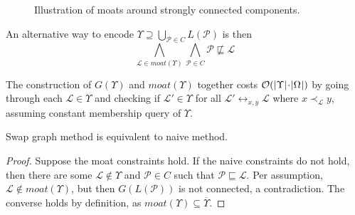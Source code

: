 \documentclass{llncs}
\DeclarePairedDelimiter{\abs}{\lvert}{\rvert}
\newcommand{\poset}[1]{\mathcal{#1}}
\newcommand{\uni}[1][]{\Omega_{#1}}
\newcommand{\lang}[1]{L(#1)}
\newcommand{\swap}[1][]{\leftrightarrow_{#1}}
\newcommand{\sgraph}[1]{G(#1)}
\newcommand{\lext}{\sqsubseteq}
\newcommand{\covered}[1][]{\prec_{#1}}
\newcommand{\complmt}[1]{\overline{#1}}
\newcommand{\bigo}[1]{\mathcal{O}(#1)}
\begin{document}
\begin{figure}[h]
    \centering
    \caption{Illustration of moats around strongly connected components.}
    \label{figure:moat}
\end{figure}

An alternative way to encode $\Upsilon \supseteq \bigcup_{\poset{P} \in C} \lang{\poset{P}}$ is then
\[
\bigwedge_{\poset{L} \in moat(\Upsilon)} \bigwedge_{\poset{P} \in C} \poset{P} \not\lext \poset{L}
\]

The construction of $\sgraph{\Upsilon}$ and $moat(\Upsilon)$ together costs $\bigo{\abs{\Upsilon} \!\cdot\! \abs{\uni}}$ by going through each $\poset{L} \!\in\! \Upsilon$ and checking if $\poset{L}' \!\in\! \Upsilon$ for all $\poset{L}' \swap[x,y] \poset{L}$ where $x \covered[\poset{L}] y$, assuming constant membership query of $\Upsilon$.

\begin{proposition}
    Swap graph method is equivalent to naive method.
\end{proposition}
\begin{proof}
    Suppose the moat constraints hold. If the naive constraints do not hold, then there are some $\poset{L} \!\notin\! \Upsilon$ and $\poset{P} \!\in\! C$ such that $\poset{P} \lext \poset{L}$. Per assumption, $\poset{L} \!\notin\! moat(\Upsilon)$, but then $\sgraph{\lang{\poset{P}}}$ is not connected, a contradiction. The converse holds by definition, as $moat(\Upsilon) \subseteq \complmt{\Upsilon}$.
\end{proof}
\end{document}
